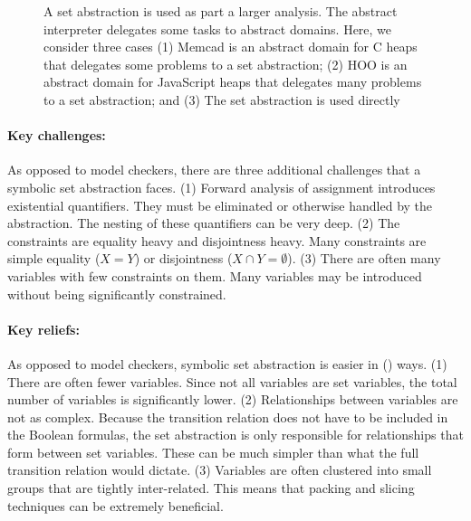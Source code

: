 \begin{figure}[tb]
    \centering
    \caption{A set abstraction is used as part a larger analysis.  The abstract interpreter delegates some tasks to abstract domains.  Here, we consider three cases (1) Memcad is an abstract domain for C heaps that delegates some problems to a set abstraction; (2) HOO is an abstract domain for JavaScript heaps that delegates many problems to a set abstraction; and (3) The set abstraction is used directly}
    \label{fig:domain-usage}
\end{figure}

\paragraph{Key challenges:}  As opposed to model checkers, there are three additional challenges that a symbolic set abstraction faces. (1) Forward analysis of assignment introduces existential quantifiers.  They must be eliminated or otherwise handled by the abstraction.  The nesting of these quantifiers can be very deep. (2) The constraints are equality heavy and disjointness heavy.  Many constraints are simple equality ($X = Y$) or disjointness ($X \cap Y = \emptyset$).  (3) There are often many variables with few constraints on them.  Many variables may be introduced without being significantly constrained.

\paragraph{Key reliefs:}  As opposed to model checkers, symbolic set abstraction is easier in () ways. (1) There are often fewer variables.  Since not all variables are set variables, the total number of variables is significantly lower.  (2) Relationships between variables are not as complex.  Because the transition relation does not have to be included in the Boolean formulas, the set abstraction is only responsible for relationships that form between set variables.  These can be much simpler than what the full transition relation would dictate.  (3) Variables are often clustered into small groups that are tightly inter-related.  This means that packing and slicing techniques can be extremely beneficial.